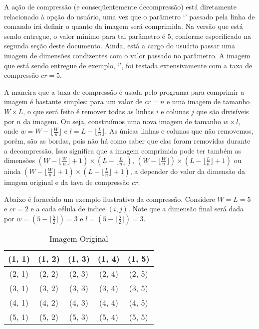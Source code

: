 \documentclass[11pt]{article}
\begin{document}
  A ação de compressão (e conseqüentemente decompressão) está diretamente relacionado à opção do usuário, uma vez que o parâmetro `{}' passado pela linha de comando irá
  definir o quanto da imagem será comprimida. Na versão que está sendo entregue, o valor mínimo para tal parâmetro é 5, conforme especificado na segunda seção deste documento. Ainda, está a cargo
  do usuário passar uma imagem de dimensões condizentes com o valor passado no parâmetro. A imagem que está sendo entregue de exemplo, `{}', foi testada extensivamente
  com a taxa de compressão $cr = 5$.

  A maneira que a taxa de compressão é usada pelo programa para comprimir a imagem é bastante simples: para um valor de $cr = n$ e uma imagem de tamanho $W \times L$, o que será feito é remover todas
  as linhas $i$ e colunas $j$ que são divisíveis por $n$ da imagem. Ou seja, construímos uma nova imagem de tamanho $w \times l$, onde $w = W - \lfloor \frac{W}{n} \rfloor$ e $l = L - \lfloor \frac{L}{n} \rfloor$.
  As únicas linhas e colunas que não removemos, porém, são as bordas, pois não há como saber que elas foram removidas durante a decompressão. Isso significa que a imagem comprimida pode ter também as dimensões
  $ (W - \lfloor \frac{W}{n} \rfloor + 1) \times (L - \lfloor \frac{L}{n} \rfloor)$, $ (W - \lfloor \frac{W}{n} \rfloor) \times (L - \lfloor \frac{L}{n} \rfloor + 1)$ ou ainda
  $ (W - \lfloor \frac{W}{n} \rfloor + 1) \times (L - \lfloor \frac{L}{n} \rfloor + 1)$, a depender do valor da dimensão da imagem original e da tava de compressão $cr$.

  Abaixo é fornecido um exemplo ilustrativo da compressão. Considere $W = L = 5$ e $cr = 2$ e a cada célula de índice $(i, j)$. Note que a dimensão final será dada por $w = (5 - \lfloor \frac{5}{2} \rfloor) = 3$ e
  $l = (5 - \lfloor \frac{5}{2} \rfloor) = 3$.

  \begin{table}[h!]
    \centering
    \begin{tabular}{| c | c | c | c | c |}
      \hline
      (1, 1) \cellcolor{gray} & (1, 2) \cellcolor{gray} & (1, 3) \cellcolor{gray} & (1, 4) \cellcolor{gray} & (1, 5) \cellcolor{gray} \\
      \hline
      (2, 1) \cellcolor{gray} & (2, 2) \cellcolor{gray} & (2, 3) \cellcolor{gray} & (2, 4) \cellcolor{gray} & (2, 5) \cellcolor{gray} \\
      \hline
      (3, 1) \cellcolor{gray} & (3, 2) \cellcolor{gray} & (3, 3) \cellcolor{gray} & (3, 4) \cellcolor{gray} & (3, 5) \cellcolor{gray} \\
      \hline
      (4, 1) \cellcolor{gray} & (4, 2) \cellcolor{gray} & (4, 3) \cellcolor{gray} & (4, 4) \cellcolor{gray} & (4, 5) \cellcolor{gray} \\
      \hline
      (5, 1) \cellcolor{gray} & (5, 2) \cellcolor{gray} & (5, 3) \cellcolor{gray} & (5, 4) \cellcolor{gray} & (5, 5) \cellcolor{gray} \\
      \hline
    \end{tabular}
    \caption*{Imagem Original}
  \end{table}
\end{document}
